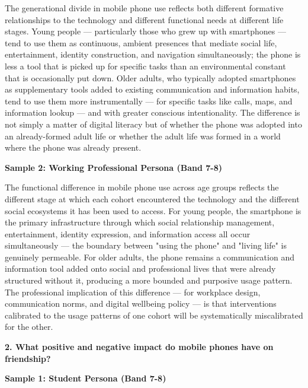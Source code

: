The generational divide in mobile phone use reflects both different formative relationships to the technology and different functional needs at different life stages. Young people — particularly those who grew up with smartphones — tend to use them as continuous, ambient presences that mediate social life, entertainment, identity construction, and navigation simultaneously; the phone is less a tool that is picked up for specific tasks than an environmental constant that is occasionally put down. Older adults, who typically adopted smartphones as supplementary tools added to existing communication and information habits, tend to use them more instrumentally — for specific tasks like calls, maps, and information lookup — and with greater conscious intentionality. The difference is not simply a matter of digital literacy but of whether the phone was adopted into an already-formed adult life or whether the adult life was formed in a world where the phone was already present.

\textbf{Sample 2: Working Professional Persona (Band 7-8)}

The functional difference in mobile phone use across age groups reflects the different stage at which each cohort encountered the technology and the different social ecosystems it has been used to access. For young people, the smartphone is the primary infrastructure through which social relationship management, entertainment, identity expression, and information access all occur simultaneously — the boundary between "using the phone" and "living life" is genuinely permeable. For older adults, the phone remains a communication and information tool added onto social and professional lives that were already structured without it, producing a more bounded and purposive usage pattern. The professional implication of this difference — for workplace design, communication norms, and digital wellbeing policy — is that interventions calibrated to the usage patterns of one cohort will be systematically miscalibrated for the other.

\separator

\begin{ieltsquestion}
\textbf{2. What positive and negative impact do mobile phones have on friendship?}
\end{ieltsquestion}
\textbf{Sample 1: Student Persona (Band 7-8)}

